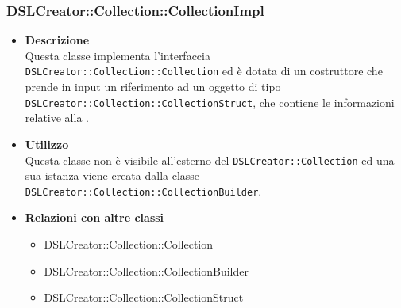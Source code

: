  \subsubsection{DSLCreator::Collection::CollectionImpl}
                    \begin{itemize}
                        \item \textbf{Descrizione} \hfill \\
                            Questa classe implementa l'interfaccia \texttt{DSLCreator::Collection::Collection} ed è dotata di un costruttore che prende in input un riferimento ad un oggetto di tipo \texttt{DSLCreator::Collection::CollectionStruct}, che contiene le informazioni relative alla .
                        \item \textbf{Utilizzo} \hfill \\
                            Questa classe non è visibile all'esterno del  \texttt{DSLCreator::Collection} ed una sua istanza viene creata dalla classe \texttt{DSLCreator::Collection::CollectionBuilder}.
                        \item \textbf{Relazioni con altre classi}
                            \begin{itemize}
                              \item DSLCreator::Collection::Collection
                              \item DSLCreator::Collection::CollectionBuilder
                              \item DSLCreator::Collection::CollectionStruct
                            \end{itemize}
                    \end{itemize}

